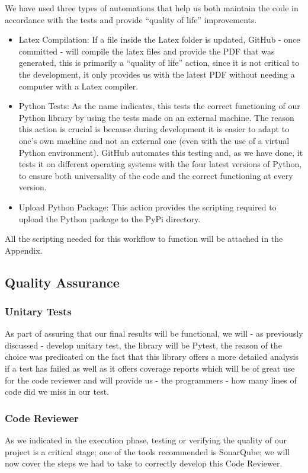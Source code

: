 We have used three types of automations that help us both maintain the code in accordance with the tests and provide ``quality of life'' improvements.
\begin{itemize}
    \item Latex Compilation: If a file inside the Latex folder is updated, GitHub - once committed - will compile the latex files and provide the PDF that was generated, this is primarily a ``quality of life'' action, since it is not critical to the development, it only provides us with the latest PDF without needing a computer with a Latex compiler.
    \item Python Tests: As the name indicates, this tests the correct functioning of our Python library by using the tests made on an external machine. The reason this action is crucial is because during development it is easier to adapt to one's own machine and not an external one (even with the use of a virtual Python environment). GitHub automates this testing and, as we have done, it tests it on different operating systems with the four latest versions of Python, to ensure both universality of the code and the correct functioning at every version.
    \item Upload Python Package: This action provides the scripting required to upload the Python package to the PyPi directory.
\end{itemize}
All the scripting needed for this workflow to function will be attached in the Appendix.
\subsection{Quality Assurance}
\subsubsection{Unitary Tests}
As part of assuring that our final results will be functional, we will - as previously discussed - develop unitary test, the library will be Pytest, the reason of the choice was predicated on the fact that this library  offers a more detailed analysis if a test has failed as well as it offers coverage reports which will be of great use for the code reviewer and will provide us - the programmers - how many lines of code did we miss in our test.

\subsubsection{Code Reviewer}
As we indicated in the execution phase, testing or verifying the quality of our project is a critical stage; one of the tools recommended is SonarQube; we will now cover the steps we had to take to correctly develop this Code Reviewer.

